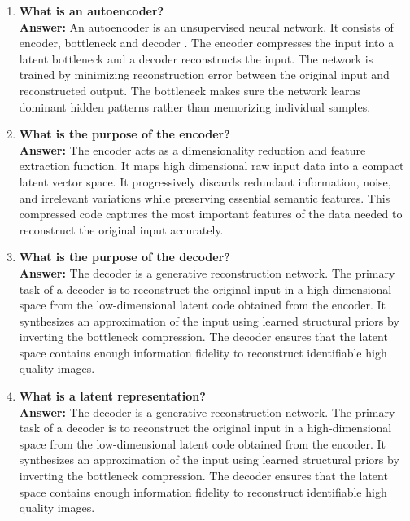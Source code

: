\documentclass[10pt]{article}
\begin{document}
\begin{enumerate}
\item \textbf{What is an autoencoder?}\\[1.5mm]
\textbf{Answer:} An autoencoder is an unsupervised neural network. It consists of encoder, bottleneck and decoder . The encoder compresses the input into a latent bottleneck and a decoder  reconstructs the input. The network is trained by minimizing reconstruction error between the original input and reconstructed output. The bottleneck makes sure the network learns dominant hidden patterns rather than memorizing individual samples.

\vspace{5mm}

\item \textbf{What is the purpose of the encoder?}\\[1.5mm]
\textbf{Answer:} The encoder acts as a dimensionality reduction and feature extraction function. It maps high dimensional raw input data into a compact latent vector space. It progressively discards redundant information, noise, and irrelevant variations while preserving essential semantic features. This compressed code captures the most important features of the data needed to reconstruct the original input accurately.

\vspace{5mm}

\item \textbf{What is the purpose of the decoder?}\\[1.5mm]
\textbf{Answer:} The decoder is a generative reconstruction network. The primary task of a decoder is to reconstruct the original input in a high-dimensional space from the low-dimensional latent code obtained from the encoder. It synthesizes an approximation of the input using learned structural priors by inverting the bottleneck compression. The decoder ensures that the latent space contains enough information fidelity to reconstruct identifiable high quality images.

\vspace{5mm}

\item \textbf{What is a latent representation?}\\[1.5mm]
\textbf{Answer:} The decoder is a generative reconstruction network. The primary task of a decoder is to reconstruct the original input in a high-dimensional space from the low-dimensional latent code obtained from the encoder. It synthesizes an approximation of the input using learned structural priors by inverting the bottleneck compression. The decoder ensures that the latent space contains enough information fidelity to reconstruct identifiable high quality images.


\end{enumerate}
\end{document}
